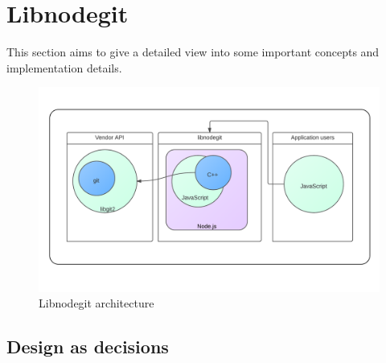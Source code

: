 \chapter{Libnodegit}

This section aims to give a detailed view into some important concepts and
implementation details.

\begin{figure}[htb]
  \centering
  \includegraphics[scale=0.2]{./diagrams/architecture.png}
  \caption{Libnodegit architecture}
  \label{fig:architecture}
\end{figure}

\section{Design as  decisions}

